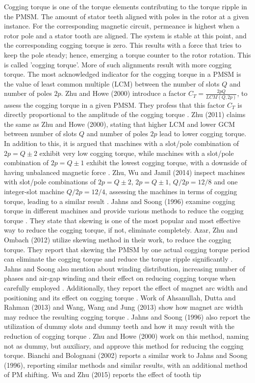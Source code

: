 \documentclass [a4 paper, 11pt, titlepage] {article}
\begin{document}
		
	Cogging torque is one of the torque elements contributing to the torque ripple in the PMSM. The amount of stator teeth aligned with poles in the rotor at a given instance. For the corresponding magnetic circuit, permeance is highest when a rotor pole and a stator tooth are aligned. The system is stable at this point, and the corresponding cogging torque is zero. This results with a force that tries to keep the pole steady; hence, emerging a torque counter to the rotor rotation. This is called 'cogging torque'. More of such alignments result with more cogging torque. 
	The most acknowledged indicator for the cogging torque in a PMSM is the value of least common multiple (LCM) between the number of slots $Q$ and number of poles $2p$. Zhu and Howe (2000) introduce a factor $C_T=\frac{2pQ}{LCM(Q,2p)}$, to assess the cogging torque in a given PMSM. They profess that this factor $C_T$ is directly proportional to the amplitude of the cogging torque \cite{zhu_influence_2000}. Zhu (2011) claims the same as Zhu and Howe (2000), stating that higher LCM and lower GCM between number of slots $Q$ and number of poles $2p$ lead to lower cogging torque. In addition to this, it is argued that machines with a slot/pole combination of $2p=Q\pm2$ exhibit very low cogging torque, while machines with a slot/pole combination of $2p=Q\pm1$ exhibit the lowest cogging torque, with a downside of having unbalanced magnetic force \cite{masmoudi_fractional_2011}. Zhu, Wu and Jamil (2014) inspect machines with slot/pole combinations of $2p=Q\pm2$, $2p=Q\pm1$, $Q/2p=12/8$ and one integer-slot machine $Q/2p=12/4$, assessing the machines in terms of cogging torque, leading to a similar result \cite{zhu_influence_2014}. Jahns and Soong (1996) examine cogging torque in different machines and provide various methods to reduce the cogging torque \cite{jahns_pulsating_1996}. They state that skewing is one of the most popular and most effective way to reduce the cogging torque, if not, eliminate completely. Azar, Zhu and Ombach (2012) utilize skewing method in their work, to reduce the cogging torque. They report that skewing the PMSM by one actual cogging torque period can eliminate the cogging torque and reduce the torque ripple significantly \cite{azar_influence_2012}. Jahns and Soong also mention about winding distribution, increasing number of phases and air-gap winding and their effect on reducing cogging torque when carefully employed \cite{jahns_pulsating_1996}. Additionally, they report the effect of magnet arc width and positioning and its effect on cogging torque \cite{jahns_pulsating_1996}. Work of Ahsanullah, Dutta and Rahman (2013) and Wang, Wang and Jung (2013) show how magnet arc width may reduce the resulting cogging torque \cite{wang_cogging_2013} \cite{ahsanullah_design_2013}. Jahns and Soong (1996) also report the utilization of dummy slots and dummy teeth and how it may result with the reduction of cogging torque \cite{jahns_pulsating_1996}. Zhu and Howe (2000) work on this method, naming not as dummy, but auxiliary, and approve this method for reducing the cogging torque. Bianchi and Bolognani (2002) reports a similar work to Jahns and Soong (1996), reporting similar methods and similar results, with an additional method of PM shifting. Wu and Zhu (2015) reports the effect of tooth tip 
\end{document}
